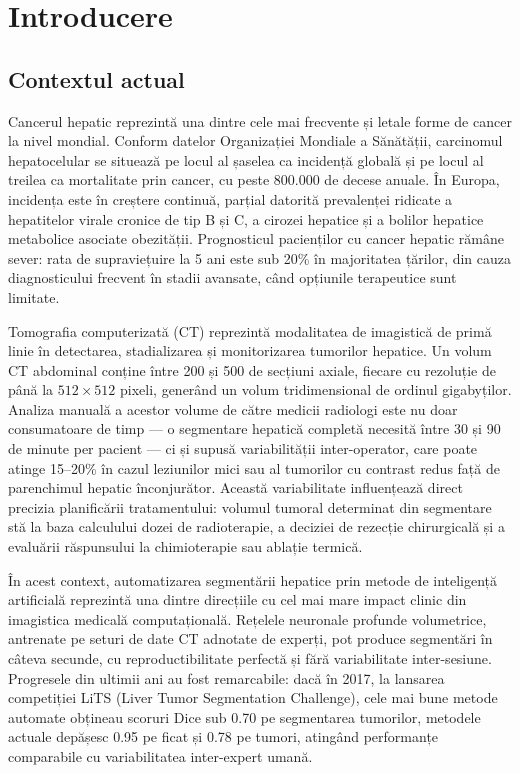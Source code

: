 \documentclass[12pt, a4paper]{report}
\begin{document}
\tableofcontents
\newpage

\chapter{Introducere}

\section{Contextul actual}

Cancerul hepatic reprezintă una dintre cele mai frecvente și letale
forme de cancer la nivel mondial. Conform datelor Organizației
Mondiale a Sănătății, carcinomul hepatocelular se situează pe locul
al șaselea ca incidență globală și pe locul al treilea ca mortalitate
prin cancer, cu peste 800.000 de decese anuale. În Europa, incidența
este în creștere continuă, parțial datorită prevalenței ridicate a
hepatitelor virale cronice de tip B și C, a cirozei hepatice și a
bolilor hepatice metabolice asociate obezității. Prognosticul
pacienților cu cancer hepatic rămâne sever: rata de supraviețuire la
5 ani este sub 20\% în majoritatea țărilor, din cauza diagnosticului
frecvent în stadii avansate, când opțiunile terapeutice sunt limitate.

Tomografia computerizată (CT) reprezintă modalitatea de imagistică
de primă linie în detectarea, stadializarea și monitorizarea
tumorilor hepatice. Un volum CT abdominal conține între 200 și 500
de secțiuni axiale, fiecare cu rezoluție de până la $512\times512$
pixeli, generând un volum tridimensional de ordinul gigabyților.
Analiza manuală a acestor volume de către medicii radiologi este
nu doar consumatoare de timp — o segmentare hepatică completă
necesită între 30 și 90 de minute per pacient — ci și supusă
variabilității inter-operator, care poate atinge 15--20\% în cazul
leziunilor mici sau al tumorilor cu contrast redus față de
parenchimul hepatic înconjurător. Această variabilitate influențează
direct precizia planificării tratamentului: volumul tumoral
determinat din segmentare stă la baza calculului dozei de
radioterapie, a deciziei de rezecție chirurgicală și a evaluării
răspunsului la chimioterapie sau ablație termică.

În acest context, automatizarea segmentării hepatice prin metode de
inteligență artificială reprezintă una dintre direcțiile cu cel mai
mare impact clinic din imagistica medicală computațională. Rețelele
neuronale profunde volumetrice, antrenate pe seturi de date CT
adnotate de experți, pot produce segmentări în câteva secunde, cu
reproductibilitate perfectă și fără variabilitate inter-sesiune.
Progresele din ultimii ani au fost remarcabile: dacă în 2017,
la lansarea competiției LiTS (Liver Tumor Segmentation Challenge),
cele mai bune metode automate obțineau scoruri Dice sub 0.70 pe
segmentarea tumorilor, metodele actuale depășesc 0.95 pe ficat
și 0.78 pe tumori, atingând performanțe comparabile cu variabilitatea
inter-expert umană.
\end{document}
